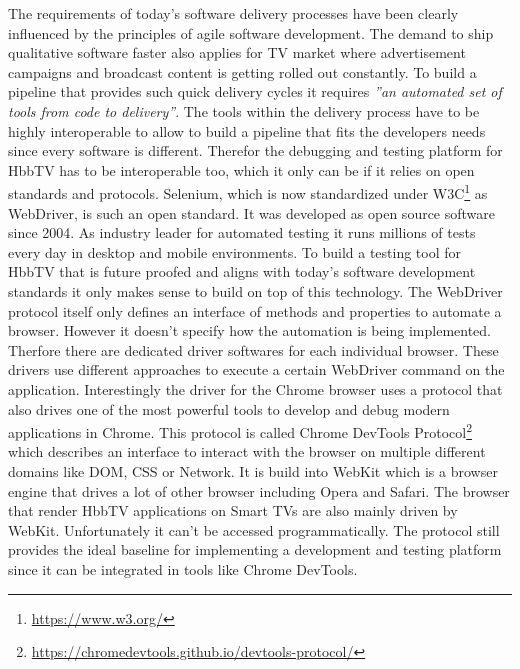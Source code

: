 The requirements of today's software delivery processes have been clearly influenced by the principles of agile software
development. The demand to ship qualitative software faster also applies for TV market where advertisement campaigns
and broadcast content is getting rolled out constantly. To build a pipeline that provides such quick delivery cycles
it requires \textit{''an automated set of tools from code to delivery''}\cite{Lehtonen2015DefiningMF}. The tools
within the delivery process have to be highly interoperable to allow to build a pipeline that fits the developers
needs since every software is different. Therefor the debugging and testing platform for HbbTV has to be interoperable
too, which it only can be if it relies on open standards and protocols. Selenium, which is now standardized under
W3C\footnote{\url{https://www.w3.org/}} as WebDriver, is such an open standard. It was developed as open source
software since 2004. As industry leader for automated testing it runs millions of tests every day in desktop and mobile
environments. To build a testing tool for HbbTV that is future proofed and aligns with today's software development
standards it only makes sense to build on top of this technology. The WebDriver protocol itself only defines an
interface of methods and properties to automate a browser. However it doesn't specify how the automation is being
implemented. Therfore there are dedicated driver softwares for each individual browser. These drivers use different
approaches to execute a certain WebDriver command on the application. Interestingly the driver for the Chrome browser
uses a protocol that also drives one of the most powerful tools to develop and debug modern applications in Chrome.
This protocol is called Chrome DevTools Protocol\footnote{\url{https://chromedevtools.github.io/devtools-protocol/}}
which describes an interface to interact with the browser on multiple different domains like DOM, CSS or Network. It
is build into WebKit which is a browser engine that drives a lot of other browser including Opera and Safari. The
browser that render HbbTV applications on Smart TVs are also mainly driven by WebKit. Unfortunately it can't be accessed
programmatically. The protocol still provides the ideal baseline for implementing a development and testing platform
since it can be integrated in tools like Chrome DevTools.

